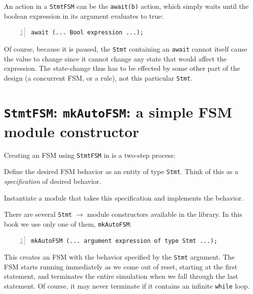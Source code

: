 An action in a \verb|StmtFSM| can be the \verb|await(b)| action, which
simply waits until the boolean expression in its argument evaluates to
true:

{\footnotesize
\begin{Verbatim}[frame=single, numbers=left]
   await (... Bool expression ...);
\end{Verbatim}
}

Of course, because it is paused, the \verb|Stmt| containing an
\verb|await| cannot itself cause the value to change since it cannot
change any state that would affect the expression.  The state-change
thus has to be effected by some other part of the {\BSV} design (a
concurrent FSM, or a rule), not this particular \verb|Stmt|.


\section{{\tt StmtFSM}: {\tt mkAutoFSM}: a simple FSM module constructor}

\label{Sec_AutoFSM}


Creating an FSM using \verb|StmtFSM| in {\BSV} is a two-step process:

\begin{tightlist}

 \item Define the desired FSM behavior as an entity of type
       \verb|Stmt|.  Think of this as a \emph{specification} of
       desired behavior.

 \item Instantiate a module that takes this specification and
       implements the behavior.

\end{tightlist}

There are several \verb|Stmt| $\longrightarrow$ module constructors
available in the {\BSV} library.  In this book we use only one of them,
\verb|mkAutoFSM|:

{\footnotesize
\begin{Verbatim}[frame=single, numbers=left]
   mkAutoFSM (... argument expression of type Stmt ...);
\end{Verbatim}
}

This creates an FSM with the behavior specified by the \verb|Stmt|
argument.  The FSM starts running immediately as we come out of reset,
starting at the first statement, and terminates the entire simulation
when we fall through the last statement.  Of course, it may never
terminate if it contains an infinite {\tt while} loop.

